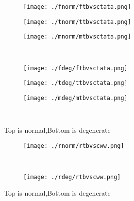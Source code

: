 \documentclass[aps,floats,floatfix,nofootinbib]{revtex4-1}
\begin{document}
\begin{center}
\begin{figure}
\begin{subfigure}{0.3\textwidth}
\texttt{[image: ./fnorm/ftbvsctata.png]}
\label{}
\end{subfigure}
\begin{subfigure}{0.3\textwidth}
\texttt{[image: ./tnorm/ttbvsctata.png]}
\label{}
\end{subfigure}
\begin{subfigure}{0.3\textwidth}
\texttt{[image: ./mnorm/mtbvsctata.png]}
\label{}
\end{subfigure}\\
\begin{subfigure}{0.3\textwidth}
\texttt{[image: ./fdeg/ftbvsctata.png]}
\label{}
\end{subfigure}
\begin{subfigure}{0.3\textwidth}
\texttt{[image: ./tdeg/ttbvsctata.png]}
\label{}
\end{subfigure}
\begin{subfigure}{0.3\textwidth}
\texttt{[image: ./mdeg/mtbvsctata.png]}
\label{}
\end{subfigure}\\
\caption{Top is normal,Bottom is degenerate}
\end{figure}
\end{center}

\begin{center}
\begin{figure}
\begin{subfigure}{0.95\textwidth}
\texttt{[image: ./rnorm/rtbvscww.png]}
\label{}
\end{subfigure}\\
\begin{subfigure}{0.95\textwidth}
\texttt{[image: ./rdeg/rtbvscww.png]}
\label{}
\end{subfigure}
\caption{Top is normal,Bottom is degenerate}
\end{figure}
\end{center}
\end{document}
